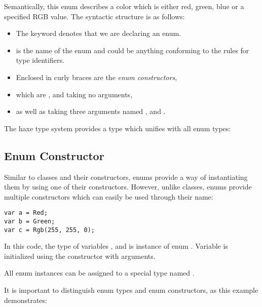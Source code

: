 \documentclass{haxe}
\begin{document}
Semantically, this enum describes a color which is either red, green, blue or a specified RGB value. The syntactic structure is as follows:
\begin{itemize}
	\item The keyword  denotes that we are declaring an enum.
	\item {} is the name of the enum and could be anything conforming to the rules for type identifiers.
	\item Enclosed in curly braces \expr{$\left\{\right\}$} are the \emph{enum constructors},
	\item which are ,  and  taking no arguments,
	\item as well as  taking three  arguments named ,  and .
\end{itemize}
The haxe type system provides a type which unifies with all enum types:


\subsection{Enum Constructor}
\label{types-enum-constructor}

Similar to classes and their constructors, enums provide a way of instantiating them by using one of their constructors. However, unlike classes, enums provide multiple constructors which can easily be used through their name:

\begin{lstlisting}
var a = Red;
var b = Green;
var c = Rgb(255, 255, 0);
\end{lstlisting}
In this code, the type of variables ,  and  is instance of enum . Variable  is initialized using the  constructor with arguments.

All enum instances can be assigned to a special type named .

It is important to distinguish enum types and enum constructors, as this example demonstrates:
\end{document}
